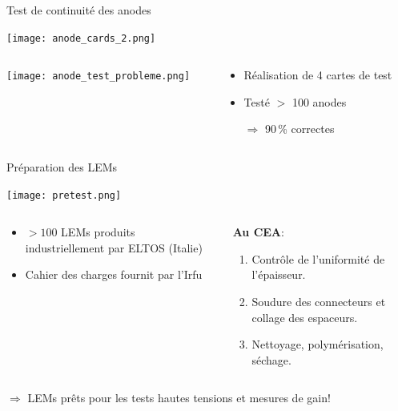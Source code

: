     \begin{frame}{Test de continuité des anodes}
        \begin{scriptsize}
            \texttt{[image: anode\_cards\_2.png]}
            \begin{columns}
                \begin{column}{0.65\textwidth}
                    \centering\texttt{[image: anode\_test\_probleme.png]}
                \end{column}
                \begin{column}{0.45\textwidth}
                    \begin{itemize}
                        \item Réalisation de 4 cartes de test
                        \item Testé $>$ 100 anodes
                        \item[$\Rightarrow$] 90\,\% correctes
                    \end{itemize}
                \end{column}\hfill
            \end{columns}
        \end{scriptsize}
    \end{frame}

    \begin{frame}{Préparation des LEMs}
    	\begin{scriptsize}
    		\begin{center}
		    	\texttt{[image: pretest.png]}
	    	\end{center}
	    	\begin{columns}
	    		\begin{column}{0.5\textwidth}
	    			\begin{itemize}
	    				\item $>100$ LEMs produits industriellement par ELTOS (Italie)
	    				\item Cahier des charges fournit par l'Irfu
	    			\end{itemize}
	    		\end{column}\hfill
	    		\begin{column}{0.5\textwidth}
	    			\textbf{\hspace{0.3cm}Au CEA}:
	    			\begin{enumerate}
	    				\item Contrôle de l'uniformité de l'épaisseur.
	    				\item Soudure des connecteurs et collage des espaceurs.
	    				\item Nettoyage, polymérisation, séchage.
	    			\end{enumerate}
	    		\end{column}
	    	\end{columns}
	    \end{scriptsize}
	    \vspace{0.5cm}
        $\Rightarrow$ LEMs prêts pour les tests hautes tensions et mesures de gain!
    \end{frame}

